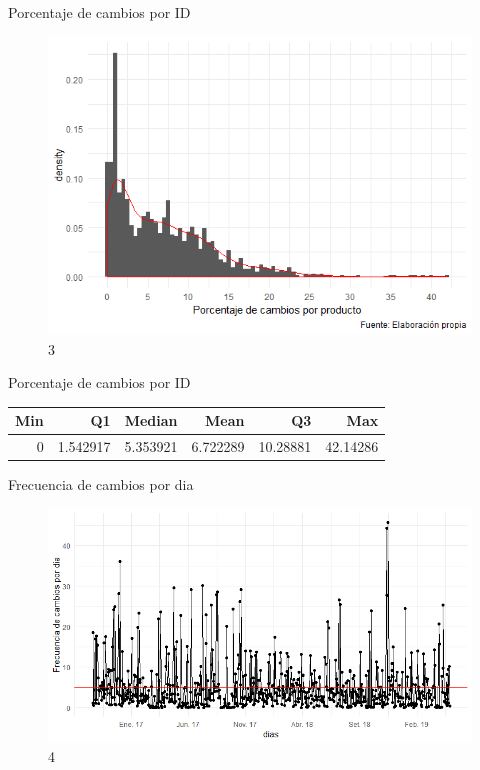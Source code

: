 \documentclass[xcolor=dvipsnames]{beamer}
\begin{document}
\begin{frame}
Porcentaje de cambios por ID
\begin{figure}
\includegraphics[scale=0.60]{cambio_producto.png}
\caption{3}
\end{figure}
\end{frame}


\begin{frame}
Porcentaje de cambios por ID
\centering
\begin{tabular}{rrrrrr}
\toprule
Min & Q1 & Median & Mean & Q3 & Max\\
\midrule
0 & 1.542917 & 5.353921 & 6.722289 & 10.28881 & 42.14286\\
\bottomrule
\end{tabular}
\end{frame}



\begin{frame}
Frecuencia de cambios por dia
\begin{figure}
\includegraphics[scale=0.60]{frecuencia_dias.png}
\caption{4}
\end{figure}
\end{frame}
\end{document}
